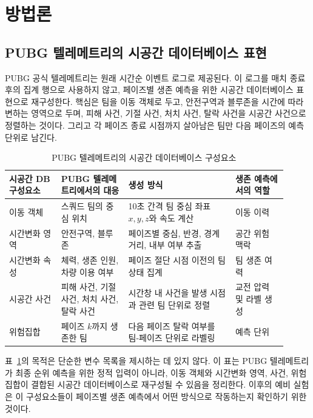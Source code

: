 \section{방법론}
\label{sec:methods}

\subsection{PUBG 텔레메트리의 시공간 데이터베이스 표현}

PUBG 공식 텔레메트리는 원래 시간순 이벤트 로그로 제공된다. 이 로그를
매치 종료 후의 집계 행으로 사용하지 않고, 페이즈별 생존 예측을 위한 시공간
데이터베이스 표현으로 재구성한다. 핵심은 팀을 이동 객체로 두고, 안전구역과
블루존을 시간에 따라 변하는 영역으로 두며, 피해 사건, 기절 사건, 처치 사건, 탈락
사건을 시공간 사건으로 정렬하는 것이다. 그리고 각 페이즈 종료 시점까지 살아남은
팀만 다음 페이즈의 예측 단위로 남긴다.

\begin{table}[t]
\centering
\caption{PUBG 텔레메트리의 시공간 데이터베이스 구성요소}
\label{tab:stdb-components}
\small
\setlength{\tabcolsep}{3pt}
\begin{tabular}{p{0.17\linewidth}p{0.22\linewidth}p{0.35\linewidth}p{0.17\linewidth}}
\toprule
시공간 DB 구성요소 & PUBG 텔레메트리에서의 대응 & 생성 방식 & 생존 예측에서의 역할 \\
\midrule
이동 객체
& 스쿼드 팀의 중심 위치
& 10초 간격 팀 중심 좌표 \(x,y,z\)와 속도 계산
& 이동 이력 \\
시간변화 영역
& 안전구역, 블루존
& 페이즈별 중심, 반경, 경계 거리, 내부 여부 추출
& 공간 위험 맥락 \\
시간변화 속성
& 체력, 생존 인원, 차량 이용 여부
& 페이즈 절단 시점 이전의 팀 상태 집계
& 팀 생존 여력 \\
시공간 사건
& 피해 사건, 기절 사건, 처치 사건, 탈락 사건
& 시간창 내 사건을 발생 시점과 관련 팀 단위로 정렬
& 교전 압력 및 라벨 생성 \\
위험집합
& 페이즈 \(k\)까지 생존한 팀
& 다음 페이즈 탈락 여부를 팀-페이즈 단위로 라벨링
& 예측 단위 \\
\bottomrule
\end{tabular}
\end{table}

표~\ref{tab:stdb-components}의 목적은 단순한 변수 목록을 제시하는 데 있지 않다.
이 표는 PUBG 텔레메트리가 최종 순위 예측을 위한 정적 입력이 아니라, 이동 객체와
시간변화 영역, 사건, 위험집합이 결합된 시공간 데이터베이스로 재구성될 수
있음을 정리한다. 이후의 예비 실험은 이 구성요소들이 페이즈별 생존 예측에서 어떤
방식으로 작동하는지 확인하기 위한 것이다.


